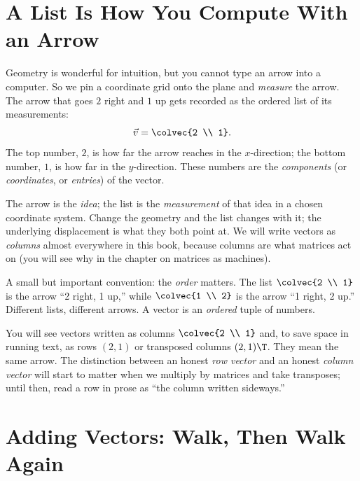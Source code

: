 \section{A List Is How You Compute With an Arrow}
\label{ch02:list}

Geometry is wonderful for intuition, but you cannot type an arrow into a computer. So we
pin a coordinate grid onto the plane and \emph{measure} the arrow. The arrow that goes
$2$ right and $1$ up gets recorded as the ordered list of its measurements:
\[
  \vec{v} = \colvec{2 \\ 1}.
\]
The top number, $2$, is how far the arrow reaches in the $x$-direction; the bottom
number, $1$, is how far in the $y$-direction. These numbers are the \emph{components} (or
\emph{coordinates}, or \emph{entries}) of the vector.

\begin{focusbox}
The arrow is the \emph{idea}; the list is the \emph{measurement} of that idea in a chosen
coordinate system. Change the geometry and the list changes with it; the underlying
displacement is what they both point at. We will write vectors as \emph{columns} almost
everywhere in this book, because columns are what matrices act on (you will see why in
the chapter on matrices as machines).
\end{focusbox}

A small but important convention: the \emph{order} matters. The list $\colvec{2 \\ 1}$ is
the arrow ``2 right, 1 up,'' while $\colvec{1 \\ 2}$ is the arrow ``1 right, 2 up.''
Different lists, different arrows. A vector is an \emph{ordered} tuple of numbers.

\begin{remark}
You will see vectors written as columns $\colvec{2 \\ 1}$ and, to save space in running
text, as rows $(2,1)$ or transposed columns $(2,1)\T$. They mean the same arrow. The
distinction between an honest \emph{row vector} and an honest \emph{column vector} will
start to matter when we multiply by matrices and take transposes; until then, read a row
in prose as ``the column written sideways.''
\end{remark}

\section{Adding Vectors: Walk, Then Walk Again}
\label{ch02:add}

